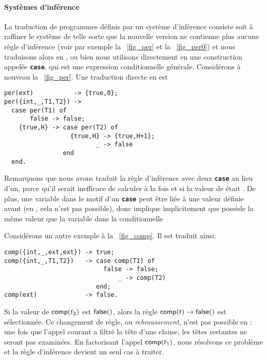 \paragraph{Systèmes d'inférence}

La traduction de programmes définis par un système d'inférence
consiste soit à raffiner le système de telle sorte que la nouvelle
version ne contienne plus aucune règle d'inférence (voir par exemple
la \fig~\vref{fig_per} et la \fig~\ref{fig_per0}) et nous traduisons
alors en \Erlang, ou bien nous utilisons directement en \Erlang une
construction appelée \texttt{\textbf{case}}, qui est une expression
conditionnelle générale. Considérons à nouveau la
\fig~\vref{fig_per}. Une traduction directe en \Erlang est
\begin{verbatim}
per(ext)           -> {true,0};
per({int,_,T1,T2}) ->
  case per(T1) of
       false -> false;
    {true,H} -> case per(T2) of
                  {true,H} -> {true,H+1};
                         _ -> false
                end
  end.
\end{verbatim}
Remarquons que nous avons traduit la règle d'inférence avec deux
\texttt{\textbf{case}} au lieu d'un, parce qu'il serait inefficace de
calculer à la fois  et  si la valeur
de  était . De plus, une variable dans
le motif d'un \texttt{\textbf{case}} peut être liée à une valeur
définie avant (en \OCaml, cela n'est pas possible), donc  implique implicitement que 
possède la même valeur que la variable  dans la
conditionnelle 

Considérons un autre exemple à la \fig~\vref{fig_comp}. Il est traduit
ainsi:
\begin{verbatim}
comp({int,_,ext,ext}) -> true;
comp({int,_,T1,T2})   -> case comp(T1) of
                           false -> false;
                               _ -> comp(T2)
                         end;
comp(ext)             -> false.
\end{verbatim}
Si la valeur de \(\textsf{comp}(t_2)\) est \(\textsf{false}()\), alors la
règle \(\textsf{comp}(t) \rightarrow \textsf{false}()\) est sélectionnée. Ce
changement de règle, ou \emph{rebroussement}, n'est pas possible en
\Erlang: une fois que l'appel courant a filtré la tête d'une clause,
les têtes restantes ne seront pas examinées. En factorisant l'appel
\(\textsf{comp}(t_1)\), nous résolvons ce problème et la règle
d'inférence devient un seul cas à traiter.

